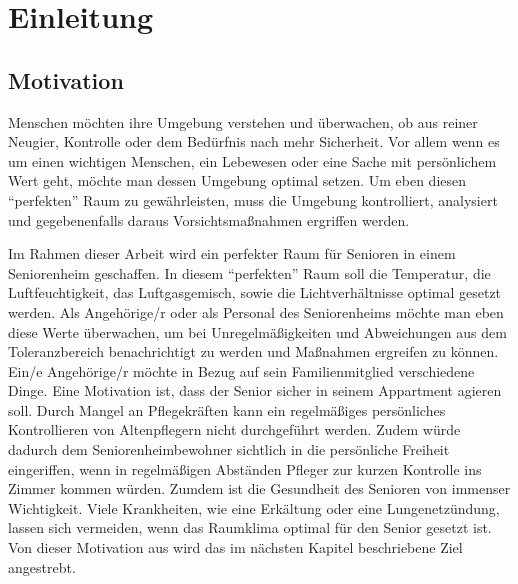 \chapter{Einleitung}

\section{Motivation}
Menschen möchten ihre Umgebung verstehen und überwachen, ob aus reiner Neugier, Kontrolle oder dem Bedürfnis nach mehr Sicherheit. Vor allem wenn es um einen wichtigen Menschen, ein Lebewesen oder eine Sache mit persönlichem Wert geht, möchte man dessen Umgebung optimal setzen. Um eben diesen ``perfekten'' Raum zu gewährleisten, muss die Umgebung kontrolliert, analysiert und gegebenenfalls daraus Vorsichtsmaßnahmen ergriffen werden.

Im Rahmen dieser Arbeit wird ein perfekter Raum für Senioren in einem Seniorenheim geschaffen. In diesem ``perfekten'' Raum soll die Temperatur, die Luftfeuchtigkeit, das Luftgasgemisch, sowie die Lichtverhältnisse optimal gesetzt werden. Als Angehörige/r oder als Personal des Seniorenheims möchte man eben diese Werte überwachen, um bei Unregelmäßigkeiten und Abweichungen aus dem Toleranzbereich benachrichtigt zu werden und Maßnahmen ergreifen zu können.\\
Ein/e Angehörige/r möchte in Bezug auf sein Familienmitglied verschiedene Dinge. Eine Motivation ist, dass der Senior sicher in seinem Appartment agieren soll. Durch Mangel an Pflegekräften kann ein regelmäßiges persönliches Kontrollieren von Altenpflegern nicht durchgeführt werden. Zudem würde dadurch dem Seniorenheimbewohner sichtlich in die persönliche Freiheit eingeriffen, wenn in regelmäßigen Abständen Pfleger zur kurzen Kontrolle ins Zimmer kommen würden. Zumdem ist die Gesundheit des Senioren von immenser Wichtigkeit. Viele Krankheiten, wie eine Erkältung oder eine Lungenetzündung, lassen sich vermeiden, wenn das Raumklima optimal für den Senior gesetzt ist.\\
Von dieser Motivation aus wird das im nächsten Kapitel beschriebene Ziel angestrebt.

